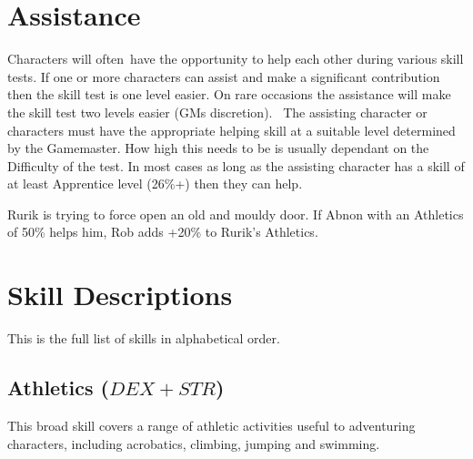 \section{Assistance}
Characters will often have the opportunity to help each other during various skill tests. If one or more characters can assist and make a significant contribution then the skill test is one level easier. On rare occasions the assistance will make the skill test two levels easier (GMs discretion).  The assisting character or characters must have the appropriate helping skill at a suitable level determined by the Gamemaster. How high this needs to be is usually dependant on the Difficulty of the test. In most cases as long as the assisting character has a skill of at least Apprentice level (26\%+) then they can help.

\begin{rpg-examplebox}
Rurik is trying to force open an old and mouldy door. If Abnon with an Athletics of 50\% helps him, Rob adds +20\% to Rurik’s Athletics.
\end{rpg-examplebox}


\section{Skill Descriptions}
This is the full list of skills in alphabetical order.

\subsection{Athletics ($DEX+STR$)}
This broad skill covers a range of athletic activities useful to adventuring characters, including acrobatics, climbing, jumping and swimming. 

